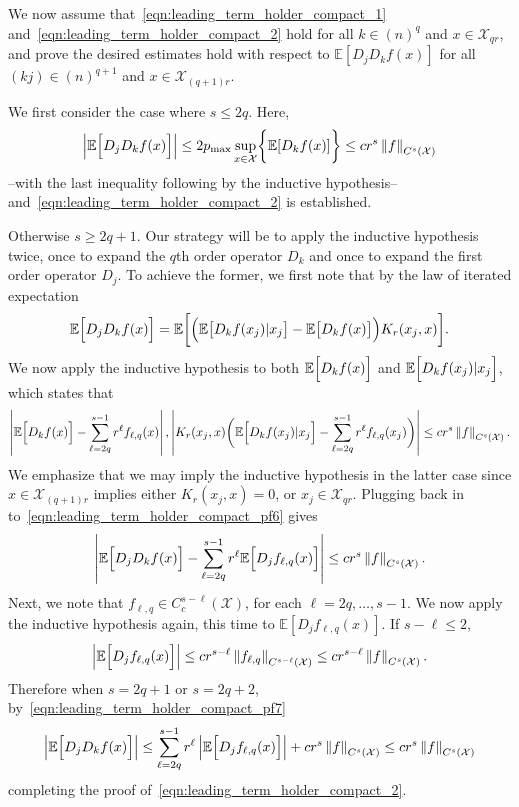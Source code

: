 \documentclass{article}
\newcommand{\abs}[1]{\left \lvert #1 \right \rvert}
\newcommand{\norm}[1]{\left \lVert #1 \right \rVert}
\newcommand{\1}{\mathbf{1}}
\newcommand{\Xset}{\mathcal{X}}
\newcommand{\Ebb}{\mathbb{E}}
\theoremstyle{alden}
\theoremstyle{aldenthm}
\theoremstyle{definition}
\theoremstyle{remark}
\begin{document}
We now assume that~\eqref{eqn:leading_term_holder_compact_1} and~\eqref{eqn:leading_term_holder_compact_2} hold for all $k \in (n)^q$ and $x \in \Xset_{qr}$, and prove the desired estimates hold with respect to $\Ebb[D_jD_kf(x)]$ for all $(kj) \in (n)^{q + 1}$ and $x \in \Xset_{(q+1)r}$.

We first consider the case where $s \leq 2q$. Here,
\begin{equation*}
\abs{\Ebb\Bigl[D_jD_kf(x)\Bigr]} \leq 2p_{\max} \sup_{x \in \Xset} \biggl\{\Ebb[D_kf(x)]\biggr\} \leq c r^s \norm{f}_{C^s(\Xset)}
\end{equation*}
--with the last inequality following by the inductive hypothesis--and~\eqref{eqn:leading_term_holder_compact_2} is established. 

Otherwise $s \geq 2q + 1$. Our strategy will be to apply the inductive hypothesis twice, once to expand the $q$th order operator $D_k$ and once to expand the first order operator $D_j$. To achieve the former, we first note that by the law of iterated expectation
\begin{equation}
\label{eqn:leading_term_holder_compact_pf6}
\Ebb\Bigl[D_jD_kf(x)\Bigr] = \Ebb\biggl[\Bigl(\Ebb\bigl[D_kf(x_j)|x_j\bigr] - \Ebb\bigl[D_kf(x)\bigr]\Bigr)K_r(x_j,x)\biggr].
\end{equation}
We now apply the inductive hypothesis to both $\Ebb\Bigl[D_kf(x)\Bigr]$ and  $\Ebb\Bigl[D_kf(x_j)|x_j\Bigr]$, which states that
\begin{equation*}
\abs{\Ebb\Bigl[D_kf(x)\Bigr] - \sum_{\ell = 2q}^{s - 1} r^{\ell}f_{\ell,q}(x)}, \abs{K_r(x_j,x)\biggl(\Ebb\Bigl[D_kf(x_j)|x_j\Bigr] - \sum_{\ell = 2q}^{s - 1} r^{\ell}f_{\ell,q}(x_j)\biggr)} \leq cr^s \norm{f}_{C^s(\Xset)}.
\end{equation*}
We emphasize that we may imply the inductive hypothesis in the latter case since $x \in \Xset_{(q+1)r}$ implies either $K_r(x_j,x) = 0$, or $x_j \in \Xset_{qr}$.
Plugging back in to~\eqref{eqn:leading_term_holder_compact_pf6} gives
\begin{equation}
\label{eqn:leading_term_holder_compact_pf7}
\abs{\Ebb\Bigl[D_jD_kf(x)\Bigr] - \sum_{\ell = 2q}^{s - 1} r^{\ell} \Ebb\Bigl[D_jf_{\ell,q}(x)\Bigr]} \leq c r^s \norm{f}_{C^s(\Xset)}.
\end{equation}
Next, we note that $f_{\ell,q} \in C_c^{s-\ell}(\Xset)$, for each $\ell = 2q,\ldots,s - 1$. We now apply the inductive hypothesis again, this time to $\Ebb[D_jf_{\ell,q}(x)]$. If $s - \ell \leq 2$,
\begin{equation*}
\abs{\Ebb\Bigl[D_jf_{\ell,q}(x)\Bigr]} \leq c r^{s - \ell} \norm{f_{\ell,q}}_{C^{s - \ell}(\Xset)} \leq c r^{s - \ell} \norm{f}_{C^{s}(\Xset)}.
\end{equation*}
Therefore when $s = 2q + 1$ or $s = 2q + 2$, by~\eqref{eqn:leading_term_holder_compact_pf7}
\begin{equation*}
\abs{\Ebb\Bigl[D_jD_kf(x)\Bigr]} \leq \sum_{\ell = 2q}^{s - 1} r^{\ell}\abs{\Ebb\Bigl[D_jf_{\ell,q}(x)\Bigr]} + c r^s \norm{f}_{C^s(\Xset)} \leq cr^s\norm{f}_{C^s(\Xset)}
\end{equation*}
completing the proof of~\eqref{eqn:leading_term_holder_compact_2}.
\end{document}

